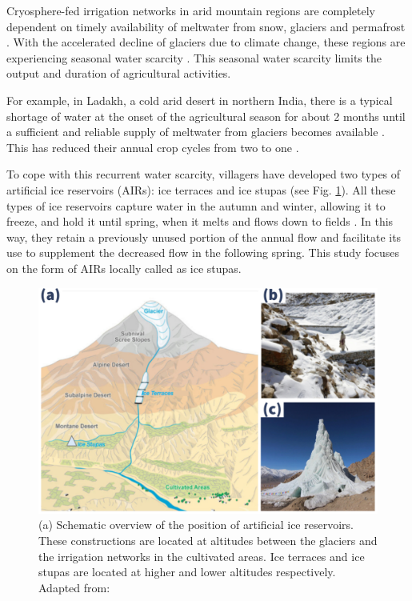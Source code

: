 \documentclass[tc, manuscript]{copernicus}
\begin{document}
\introduction

Cryosphere-fed irrigation networks in arid mountain regions are completely dependent on timely availability of
meltwater from snow, glaciers and permafrost \citep{immerzeelImportanceVulnerabilityWorld2020,
farhanHydrologicalRegimesConjunction2015, tveitenGlacierGrowingLocal2007}. With the accelerated decline of
glaciers due to climate change, these regions are experiencing seasonal water scarcity
\citep{hoelzleStatusRoleAlpine2019, xenariosAralSeaBasin2019, barandunStateFutureCryosphere2020}. This seasonal
water scarcity limits the output and duration of agricultural activities.

For example, in Ladakh, a cold arid desert in northern India, there is a typical shortage of water at the onset
of the agricultural season for about 2 months until a sufficient and reliable supply of meltwater from glaciers
becomes available \citep{norphelSnowWaterHarvesting2015, nusserLocalKnowledgeGlobal2016,
vincentEnergyClimateChange2009}. This has reduced their annual crop cycles from two to one
\citep{nusserSociohydrologyArtificialGlaciers2019}.

To cope with this recurrent water scarcity, villagers have developed two types of artificial ice reservoirs
(AIRs): ice terraces and ice stupas (see Fig. \ref{fig:AIRforms}).  All these types of ice reservoirs capture
water in the autumn and winter, allowing it to freeze, and hold it until spring, when it melts and flows down to
fields \citep{ipccChapterHighMountain2019, vinceGlacierMan2009, clouseLadakhArtificialGlaciers2017,
nusserSociohydrologyArtificialGlaciers2019}. In this way, they retain a previously unused portion of the annual
flow and facilitate its use to supplement the decreased flow in the following spring. This study focuses on the
form of AIRs locally called as ice stupas.

\begin{figure}[t]
\includegraphics[width=12cm]{Figures/AIR_forms.jpg}

\caption{(a) Schematic overview of the position of artificial ice reservoirs. These constructions are located at
altitudes between the glaciers and the irrigation networks in the cultivated areas. Ice terraces and ice stupas
are located at higher and lower altitudes respectively. Adapted from: \cite{nusserLocalKnowledgeGlobal2016}}

\label{fig:AIRforms}
\end{figure}
\end{document}

